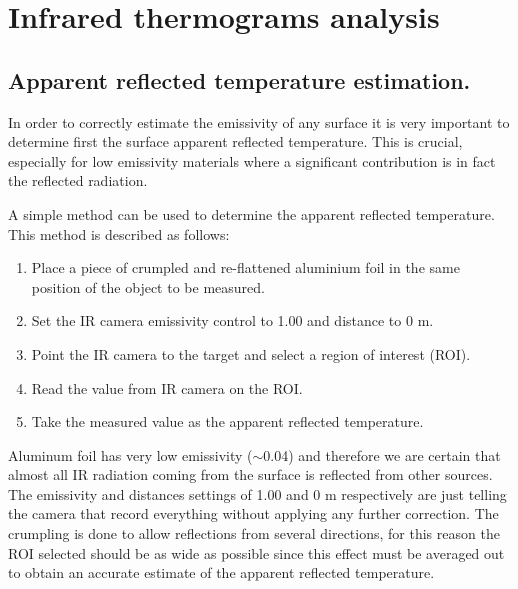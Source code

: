 \pagestyle{standard}

\chapter{Infrared thermograms analysis}\label{chapter3}

	\thispagestyle{chapter-first-page}

	\section{Apparent reflected temperature estimation.}\label{section3.1}
	
		In order to correctly estimate the emissivity of any surface it is very important to determine first the surface apparent reflected temperature. This is crucial, especially for low emissivity materials where a significant contribution is in fact the reflected radiation.
		
		A simple method can be used to determine the apparent reflected temperature. This method is described as follows:
		
		\begin{enumerate}[label={\arabic*)}]
			\item Place a piece of crumpled and re-flattened aluminium foil in the same position of the object to be measured.
			\item Set the IR camera emissivity control to 1.00 and distance to 0 m.
			\item Point the IR camera to the target and select a region of interest (ROI).
			\item Read the value from IR camera on the ROI.
			\item Take the measured value as the apparent reflected temperature.
		\end{enumerate}
	
		Aluminum foil has very low emissivity ($\sim$0.04) and therefore we are certain that almost all IR radiation coming from the surface is reflected from other sources. The emissivity and distances settings of 1.00 and 0 m respectively are just telling the camera that record everything without applying any further correction. The crumpling is done to allow reflections from several directions, for this reason the ROI selected should be as wide as possible since this effect must be averaged out to obtain an accurate estimate of the apparent reflected temperature.\bigskip
	
